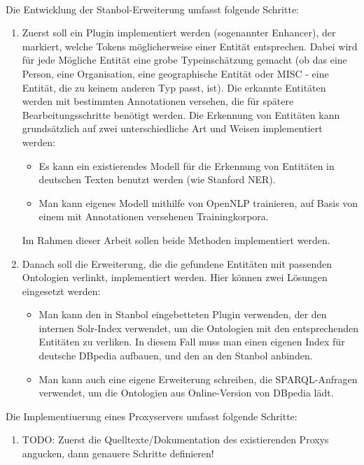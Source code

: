 \paragraph{}
Die Entwicklung der Stanbol-Erweiterung umfasst folgende Schritte:
\begin{enumerate}
\item Zuerst soll ein Plugin implementiert werden (sogenannter Enhancer), der markiert, welche Tokens möglicherweise einer Entität entsprechen. Dabei wird für jede Mögliche Entität eine grobe Typeinschätzung gemacht (ob das eine Person, eine Organisation, eine geographische Entität oder MISC - eine Entität, die zu keinem anderen Typ passt, ist). Die erkannte Entitäten werden mit bestimmten Annotationen versehen, die für spätere Bearbeitungsschritte benötigt werden. Die Erkennung von Entitäten kann grundsätzlich auf zwei unterschiedliche Art und Weisen implementiert werden:  
\begin{itemize}
\item Es kann ein existierendes Modell für die Erkennung von Entitäten in deutschen Texten benutzt werden (wie Stanford NER).
\item Man kann eigenes Modell mithilfe von OpenNLP trainieren, auf Basis von einem mit Annotationen versehenen Trainingkorpora.
\end{itemize}
Im Rahmen dieser Arbeit sollen beide Methoden implementiert werden.

\item Danach soll die Erweiterung, die die gefundene Entitäten mit passenden Ontologien verlinkt, implementiert werden. Hier können zwei Lösungen eingesetzt werden:
\begin{itemize}
\item Man kann den in Stanbol eingebetteten Plugin verwenden, der den internen Solr-Index verwendet, um die Ontologien mit den entsprechenden Entitäten zu verliken. In diesem Fall muss man einen eigenen Index für deutsche DBpedia aufbauen, und den an den Stanbol anbinden.
\item Man kann auch eine eigene Erweiterung schreiben, die SPARQL-Anfragen verwendet, um die Ontologien aus Online-Version von DBpedia lädt.
\end{itemize}
\end{enumerate}

Die Implementiuerung eines Proxyservers umfasst folgende Schritte:
\begin{enumerate}
\item TODO: Zuerst die Quelltexte/Dokumentation des existierenden Proxys angucken, dann genauere Schritte definieren!
\end{enumerate}

